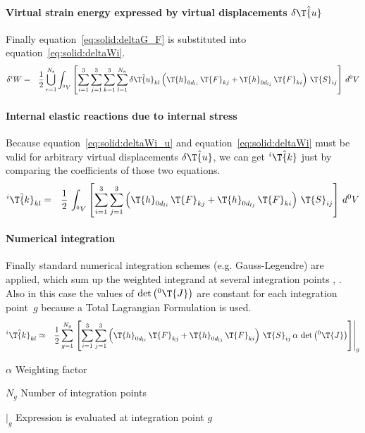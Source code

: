 \paragraph{Virtual strain energy expressed by virtual displacements $\delta{\hat{\T{u}}}$}
Finally equation~\ref{eq:solid:deltaG_F} is substituted into equation~\ref{eq:solid:deltaWi}.
\begin{eqnarray}
\delta ^iW & = & \frac{1}{2} \bigcup_{e=1}^{N_e} \int_{^0V} \left[ \sum_{i=1}^3 \sum_{j=1}^3 \sum_{k=1}^3 \sum_{l=1}^{N_n} \delta \hat{\T{u}}_{kl}\left(\T{h}_{0d_{li}} \, \T{F}_{kj} + \T{h}_{0d_{lj}} \, \T{F}_{ki}\right) \, \T{S}_{ij} \right] \, d^0V \label{eq:solid:deltaWi_u}
\end{eqnarray}

\paragraph{Internal elastic reactions due to internal stress}
Because equation~\ref{eq:solid:deltaWi_u} and equation~\ref{eq:solid:deltaWi} must be valid for arbitrary virtual displacements $\delta\hat{\T{u}}$, we can get $^i\hat{\T{k}}$ just by comparing the coefficients of those two equations.
\begin{eqnarray}
^i\hat{\T{k}}_{kl} & = & \frac{1}{2} \, \int_{^0V} \left[ \sum_{i=1}^3 \sum_{j=1}^3 \left(\T{h}_{0d_{li}} \, \T{F}_{kj} + \T{h}_{0d_{lj}} \, \T{F}_{ki}\right) \, \T{S}_{ij} \right] \, d^0V
\end{eqnarray}

\paragraph{Numerical integration}
Finally standard numerical integration schemes (e.g. Gauss-Legendre) are applied, which sum up the weighted integrand at several integration points \cite{BATHE2016}, \cite{KUEBLER2005}.
Also in this case the values of $\det{\left({^0}\T{J}\right)}$ are constant for each integration point~$g$ because a Total Lagrangian Formulation is used.
\begin{eqnarray}
^i\hat{\T{k}}_{kl} & \approx & \frac{1}{2} \sum_{g=1}^{N_g} \left.\left[ \sum_{i=1}^3 \sum_{j=1}^3 \left(\T{h}_{0d_{li}} \, \T{F}_{kj} + \T{h}_{0d_{lj}} \, \T{F}_{ki}\right) \, \T{S}_{ij}  \, \alpha \, \det{\left({^0}\T{J}\right)}\right]\right\vert_{g}
\end{eqnarray}
\begin{description}
\item{$\alpha$} Weighting factor
\item{$N_g$} Number of integration points
\item{$\vert_g$} Expression is evaluated at integration point $g$
\end{description}


